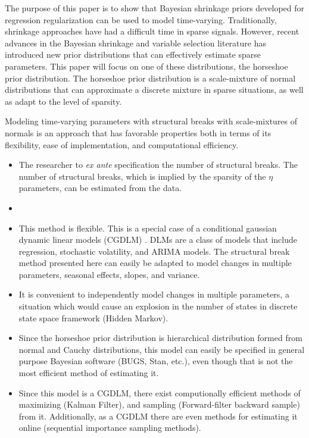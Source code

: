 \documentclass{article}
\begin{document}
The purpose of this paper is to show that Bayesian shrinkage priors developed for regression regularization can be used to model time-varying.
Traditionally, shrinkage approaches have had a difficult time in sparse signals.
However, recent advances in the Bayesian shrinkage and variable selection literature has introduced new prior distributions that can effectively estimate sparse parameters. 
This paper will focus on one of these distributions, the horseshoe prior distribution.
The horseshoe prior distribution is a scale-mixture of normal distributions that can approximate a discrete mixture in sparse situations, as well as adapt to the level of sparsity.

Modeling time-varying parameters with structural breaks with scale-mixtures of normals is an approach that has favorable properties both in terms of its flexibility, ease of implementation, and computational efficiency.
\begin{itemize}
\item The researcher to \textit{ex ante} specification the number of structural breaks. 
  The number of structural breaks, which is implied by the sparsity of the $\eta$ parameters, can be estimated from the data.
\item 
\item This method is flexible.
  This is a special case of a conditional gaussian dynamic linear models (CGDLM) \parencites{WestHarrison1997}{DurbinKoopman2012}{CommandeurKoopman2007}{ShumwayStoffer2010}.
  DLMs are a class of models that include regression, stochastic volatility, and ARIMA models.
  The structural break method presented here can easily be adapted to model changes in multiple parameters, seasonal effects, slopes, and variance.
\item It is convenient to independently model changes in multiple parameters, a situation which would cause an explosion in the number of states in discrete state space framework (Hidden Markov).
\item Since the horseshoe prior distribution is hierarchical distribution formed from normal and Cauchy distributions, this model can easily be specified in general purpose Bayesian software (BUGS, Stan, etc.), even though that is not the most efficient method of estimating it.
\item Since this model is a CGDLM, there exist computionally  efficient methods of maximizing (Kalman Filter), and sampling (Forward-filter backward sample) from it.
  Additionally, as a CGDLM there are even methods for estimating it online (sequential importance sampling methods).
\end{itemize}
\end{document}
